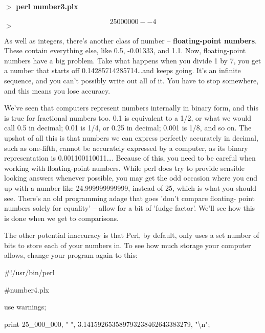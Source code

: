 \documentclass[a4paper,11pt]{book}
\begin{document}
\noindent 

\noindent $>$ \textbf{perl number3.plx}

\[25000000 --4\] 
$>$

\noindent 

\noindent As well as integers, there's another class of number -- \textbf{floating-point numbers}. These contain everything else, like 0.5, -0.01333, and 1.1. Now, floating-point numbers have a big problem. Take what happens when you divide 1 by 7, you get a number that starts off 0.14285714285714\dots  and keeps going. It's an infinite sequence, and you can't possibly write out all of it. You have to stop somewhere, and this means you lose accuracy.

\noindent 

\noindent We've  seen that computers  represent  numbers  internally  in  binary  form,  and  this  is  true for  fractional numbers too.  0.1  is equivalent  to  a  1/2,  or what  we would  call  0.5 in  decimal;  0.01  is  1/4,  or  0.25 in decimal;  0.001  is  1/8,  and so  on.  The  upshot  of all  this  is  that  numbers  we  can express  perfectly accurately  in decimal,  such as  one-fifth,  cannot  be  accurately  expressed  by  a  computer, as its binary representation is 0.001100110011\dots .  Because  of  this,  you  need  to  be  careful  when  working  with floating-point numbers.  While  perl  does  try  to  provide  sensible looking  answers  whenever  possible, you  may get the odd occasion  where  you  end  up  with  a  number  like  24.999999999999,  instead  of  25, which is what you  should see.  There's  an old  programming  adage  that  goes  'don't  compare  floating- point numbers solely for equality'  --  allow  for  a  bit  of 'fudge  factor'.  We'll  see how  this  is  done when we get to comparisons.

\noindent 

\noindent The other potential inaccuracy is that Perl, by default, only uses a set number of bits to store each of your numbers in. To see how much storage your computer allows, change your program again to this:

\noindent 

\noindent 

\noindent \#!/usr/bin/perl

\noindent \#number4.plx

\noindent use warnings;

\noindent print 25\_000\_000, " ", 3.141592653589793238462643383279, "\textbackslash n";
\end{document}
